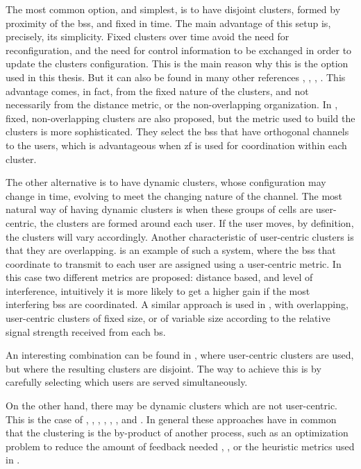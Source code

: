 The most common option, and simplest, is to have disjoint clusters, formed by
proximity of the \glspl{bs}, and fixed in time. The main advantage of this setup
is, precisely, its simplicity. Fixed clusters over time avoid the need for
reconfiguration, and the need for control information to be exchanged in order
to update the clusters configuration. This is the main reason why this is the
option used in this thesis. But it can also be found in many other references
\cite{zhang09}, \cite{huang09}, \cite{ramprashad10}, \cite{hosseini13}. This
advantage comes, in fact, from the fixed nature of the clusters, and not
necessarily from the distance metric, or the non-overlapping organization. In
\cite{swannack05}, fixed, non-overlapping clusters are also proposed, but the
metric used to build the clusters is more sophisticated. They select the
\glspl{bs} that have orthogonal channels to the users, which is advantageous
when \gls{zf} is used for coordination within each cluster.

The other alternative is to have dynamic clusters, whose configuration may
change in time, evolving to meet the changing nature of the channel. The most
natural way of having dynamic clusters is when these groups of cells are
user-centric, \ie the clusters are formed around each user. If the user moves,
by definition, the clusters will vary accordingly. Another characteristic of
user-centric clusters is that they are overlapping. \cite{ng10} is an example of
such a system, where the \glspl{bs} that coordinate to transmit to each user are
assigned using a user-centric metric. In this case two different metrics are
proposed: distance based, and level of interference, intuitively it is more
likely to get a higher gain if the most interfering \glspl{bs} are coordinated.
A similar approach is used in \cite{gong11}, with overlapping, user-centric
clusters of fixed size, or of variable size according to the relative signal
strength received from each \gls{bs}.

An interesting combination can be found in \cite{baracca12}, where user-centric
clusters are used, but where the resulting clusters are disjoint. The way to
achieve this is by carefully selecting which users are served simultaneously.

On the other hand, there may be dynamic clusters which are not user-centric.
This is the case of \cite{papadogiannis08}, \cite{papadogiannis10},
\cite{papadogiannis11}, \cite{moon11}, \cite{cui11}, \cite{lakshmana12}, and
\cite{mingyi13}. In general these approaches have in common that the clustering
is the by-product of another process, such as an optimization problem to reduce
the amount of feedback needed \cite{papadogiannis11}, \cite{lakshmana12}, or the
heuristic metrics used in \cite{moon11}.

